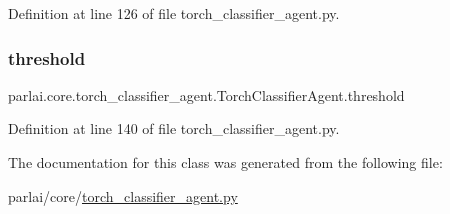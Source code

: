 Definition at line 126 of file torch\+\_\+classifier\+\_\+agent.\+py.

\mbox{\label{classparlai_1_1core_1_1torch__classifier__agent_1_1TorchClassifierAgent_aba6e1d0ef53762f5930c271c3ae8d63a}} 
\subsubsection{\texorpdfstring{threshold}{threshold}}
{\footnotesize\ttfamily parlai.\+core.\+torch\+\_\+classifier\+\_\+agent.\+Torch\+Classifier\+Agent.\+threshold}



Definition at line 140 of file torch\+\_\+classifier\+\_\+agent.\+py.



The documentation for this class was generated from the following file\+:\begin{DoxyCompactItemize}
\item 
parlai/core/\hyperlink{torch__classifier__agent_8py}{torch\+\_\+classifier\+\_\+agent.\+py}\end{DoxyCompactItemize}
